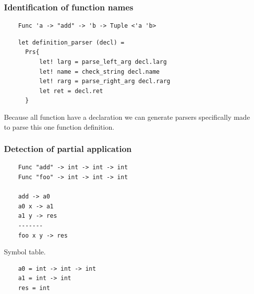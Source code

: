 
\begin{frame}[fragile]
    \frametitle{Identification of function names}
    
    \begin{lstlisting}
    Func 'a -> "add" -> 'b -> Tuple <'a 'b>
    \end{lstlisting}

    \begin{lstlisting}
    let definition_parser (decl) =
      Prs{
          let! larg = parse_left_arg decl.larg
          let! name = check_string decl.name
          let! rarg = parse_right_arg decl.rarg
          let ret = decl.ret
      }
    \end{lstlisting}

    Because all function have a declaration we can generate parsers specifically made to parse this one function definition. 

\end{frame}



\begin{frame}[fragile]
    \frametitle{Detection of partial application}   
    
    \begin{lstlisting}
    Func "add" -> int -> int -> int
    Func "foo" -> int -> int -> int
    
    add -> a0
    a0 x -> a1
    a1 y -> res
    -------
    foo x y -> res
    \end{lstlisting}

    Symbol table.
    \begin{lstlisting}
    a0 = int -> int -> int
    a1 = int -> int
    res = int
    \end{lstlisting}


\end{frame}


